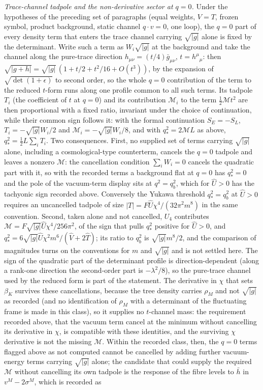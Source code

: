 \emph{Trace-channel tadpole and the non-derivative sector at \(q=0\).} Under the hypotheses of the preceding set of paragraphs (equal weights, \(V=T\), frozen symbol, product background, static channel \(q\cdot v=0\), one loop), the \(q=0\) part of every density term that enters the trace channel carrying \(\sqrt{|g|}\) alone is fixed by the determinant. Write such a term as \(W_i\sqrt{|g|}\) at the background and take the channel along the pure-trace direction \(h_{\mu\nu}=(t/4)\bar g_{\mu\nu}\), \(t=h^\mu{}_\mu\): then \(\sqrt{|g+h|}=\sqrt{|g|}\,(1+t/2+t^2/16+O(t^3))\), by the expansion of \(\sqrt{\det(1+\epsilon)}\) to second order, so the whole \(q=0\) contribution of the term to the reduced \(t\)-form runs along one profile common to all such terms. Its tadpole \(T_i\) (the coefficient of \(t\) at \(q=0\)) and its contribution \(\mathcal M_i\) to the term \(\tfrac12\mathcal Mt^2\) are then proportional with a fixed ratio, invariant under the choice of continuation, while their common sign follows it: with the formal continuation \(S_E=-S_L\), \(T_i=-\sqrt{|g|}W_i/2\) and \(\mathcal M_i=-\sqrt{|g|}W_i/8\), and with \(q_*^2=2\mathcal ML\) as above, \(q_*^2=\tfrac12L\sum_iT_i\). Two consequences. First, no supplied set of terms carrying \(\sqrt{|g|}\) alone, including a cosmological-type counterterm, cancels the \(q=0\) tadpole and leaves a nonzero \(\mathcal M\): the cancellation condition \(\sum_iW_i=0\) cancels the quadratic part with it, so with the recorded terms a background flat at \(q=0\) has \(q_*^2=0\) and the pole of the vacuum-term display sits at \(q^2=q_b^2\), which for \(\hat U>0\) has the tachyonic sign recorded above. Conversely the Yukawa threshold \(q_*^2=q_b^2\) at \(\hat U>0\) requires an uncancelled tadpole of size \(|T|=F\hat U\chi^4/(32\pi^2m^8)\) in the same convention. Second, taken alone and not cancelled, \(U_4\) contributes \(\mathcal M=F\sqrt{|g|}\hat U\chi^4/256\pi^2\), of the sign that pulls \(q_*^2\) positive for \(\hat U>0\), and \(q_*^2=6\sqrt{|g|}\hat U\chi^2m^6/(\hat V+2\hat T)\); its ratio to \(q_b^2\) is \(\sqrt{|g|}m^8/2\), and the comparison of magnitudes turns on the conventions for \(m\) and \(\sqrt{|g|}\) and is not settled here. The sign of the quadratic part of the determinant profile is direction-dependent (along a rank-one direction the second-order part is \(-\lambda^2/8\)), so the pure-trace channel used by the reduced form is part of the statement. The derivative in \(\chi\) that sets \(\beta_K\) survives these cancellations, because the tree density carries \(\rho_M\) and not \(\sqrt{|g|}\) as recorded (and no identification of \(\rho_M\) with a determinant of the fluctuating frame is made in this class), so it supplies no \(t\)-channel mass: the requirement recorded above, that the vacuum term cancel at the minimum without cancelling its derivative in \(\chi\), is compatible with these identities, and the surviving \(\chi\) derivative is not the missing \(\mathcal M\). Within the recorded class, then, the \(q=0\) terms flagged above as not computed cannot be cancelled by adding further vacuum-energy terms carrying \(\sqrt{|g|}\) alone; the candidate that could supply the required \(\mathcal M\) without cancelling its own tadpole is the response of the fibre levels to \(\bar h\) in \(v^M-2\sigma^M\), which is recorded as 